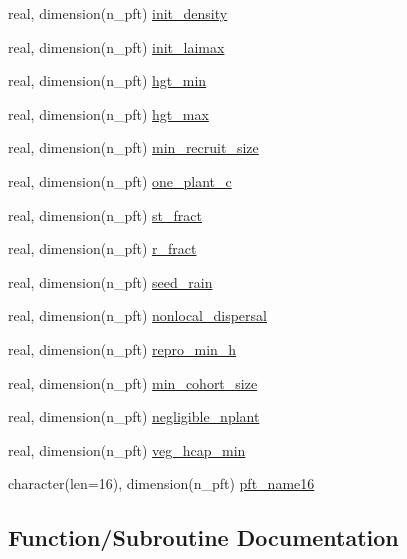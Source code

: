 \begin{DoxyCompactItemize}
\item 
real, dimension(n\+\_\+pft) \hyperlink{namespacepft__coms_aad950f9e3b7c51796f0c72acbf85198d}{init\+\_\+density}
\item 
real, dimension(n\+\_\+pft) \hyperlink{namespacepft__coms_aee1c14f39841cdf40c9655ae6eab2e85}{init\+\_\+laimax}
\item 
real, dimension(n\+\_\+pft) \hyperlink{namespacepft__coms_aab740dc3cca80fdd00440b412f111a74}{hgt\+\_\+min}
\item 
real, dimension(n\+\_\+pft) \hyperlink{namespacepft__coms_a81703797d07f20bd129277ed6a78e30e}{hgt\+\_\+max}
\item 
real, dimension(n\+\_\+pft) \hyperlink{namespacepft__coms_a4a008038dd34f2531f2ca7637c6e74b0}{min\+\_\+recruit\+\_\+size}
\item 
real, dimension(n\+\_\+pft) \hyperlink{namespacepft__coms_a584bfab014a9ec5b4a5d7ed9e458df9f}{one\+\_\+plant\+\_\+c}
\item 
real, dimension(n\+\_\+pft) \hyperlink{namespacepft__coms_a24d6f9401bfd2a1127dbc4b957a6d94e}{st\+\_\+fract}
\item 
real, dimension(n\+\_\+pft) \hyperlink{namespacepft__coms_a588d74ddc11417f923b20d000e0740aa}{r\+\_\+fract}
\item 
real, dimension(n\+\_\+pft) \hyperlink{namespacepft__coms_a9e5f0badf00a834a699115fc8974d9f2}{seed\+\_\+rain}
\item 
real, dimension(n\+\_\+pft) \hyperlink{namespacepft__coms_ab4b143dec3e017f4e90ee99ca12bb329}{nonlocal\+\_\+dispersal}
\item 
real, dimension(n\+\_\+pft) \hyperlink{namespacepft__coms_a30fe0a0ce90033d81e78cc82c9b70017}{repro\+\_\+min\+\_\+h}
\item 
real, dimension(n\+\_\+pft) \hyperlink{namespacepft__coms_ae271b74cd105b2cf539a630a97cfc185}{min\+\_\+cohort\+\_\+size}
\item 
real, dimension(n\+\_\+pft) \hyperlink{namespacepft__coms_a35da186f9b0c1860742f4496333703a7}{negligible\+\_\+nplant}
\item 
real, dimension(n\+\_\+pft) \hyperlink{namespacepft__coms_a0bc569727ea7f49b70751189cb07d8fc}{veg\+\_\+hcap\+\_\+min}
\item 
character(len=16), dimension(n\+\_\+pft) \hyperlink{namespacepft__coms_abbfea830303582f918e1630cb7009694}{pft\+\_\+name16}
\end{DoxyCompactItemize}


\subsection{Function/\+Subroutine Documentation}
\hypertarget{namespacepft__coms_a7d92f11102baa7fd26b952a5c9ea83fc}{}
